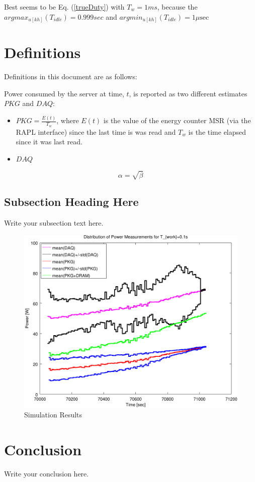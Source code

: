 \documentclass{article}
\newcommand{\mref}[1]{Eq. (\ref{#1})}
\begin{document}
Best seems to be \mref{trueDuty} with $T_w=1ms$, because the $arg max_{u[kh]}(T_{idle})=0.999sec$ and $arg min_{u[kh]}(T_{idle})=1 \mu\text{sec}$

\section{Definitions}
Definitions in this document are as follows:

Power consumed by the server at time, $t$, is reported as two different estimates $PKG$ and $DAQ$:
\begin{itemize}
	\item $PKG=\frac{E(t)}{T_w}$, where $E(t)$ is the value of the energy counter MSR (via the RAPL interface) since the last time is was read and $T_w$ is the time elapsed since it was last read.
	\item $DAQ$ 
\end{itemize}
\begin{equation}
    \label{simple_equation}
    \alpha = \sqrt{ \beta }
\end{equation}

\subsection{Subsection Heading Here}
Write your subsection text here.

\begin{figure}
    \centering
    \includegraphics[width=\textwidth]{insertDelayTw100msCropped}
    \caption{Simulation Results}
    \label{simulationfigure}
\end{figure}

\section{Conclusion}
Write your conclusion here.
\end{document}
